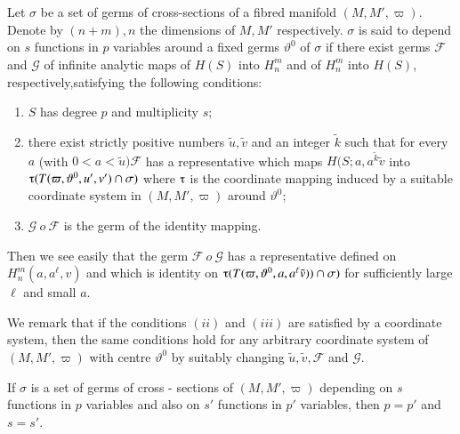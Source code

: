 \section{}\label{chap1:sec1.12} %

\begin{defi*}%
  Let $\sigma$ be a set of germs of cross-sections of a fibred
  manifold $(M,  M',  \varpi)$. Denote by $(n+m),  n$ the dimensions
  of $M,  M'$ respectively. $\sigma$ is said to depend on $s$
  functions in $p$ variables around a fixed germs $\vartheta^0$ of
  $\sigma$ if there exist germs $\mathscr{F}$ and $\mathscr{G}$ of
  infinite analytic maps of $H(S)$ into $H^m_n$ and of $H^m_n$ into
  $H(S)$,  respectively,\pageoriginale  satisfying the following conditions: 
  \begin{enumerate}[\rm (i)]
  \item $S$ has degree $p$ and multiplicity $s$;
  \item there exist strictly positive numbers $\tilde{u},  \tilde{v}$
    and an integer $\tilde{k}$ such that for every $a$ (with $0 < a <
    \tilde{u}) \mathscr{F}$ has a representative which maps $H(S; a,
    a^{\tilde{k}} \tilde{v}$ into $\tauup (T(\varpi,  \vartheta^0,
    u',  v') \cap \sigma)$ where $\tauup$ is the coordinate mapping
    induced by a suitable coordinate system in $(M,  M',  \varpi)$
    around $\vartheta^0$; 
  \item $\mathscr{G} ~o ~ \mathscr{F}$ is the germ of the identity mapping.
  \end{enumerate}
\end{defi*}

Then we see easily that the germ $\mathscr{F} ~ o ~ \mathscr{G}$ has a
representative defined on $H^m_n (a,  a^\ell,  v)$ and which is
identity on $\tauup (T(\varpi,  \vartheta^0,  a,  a^\ell \tilde{v}))
\cap \sigma)$ for sufficiently large $\ell$ and small $a$. 

We remark that if the conditions $(ii)$ and $(iii)$ are satisfied by a
coordinate system,  then the same conditions hold for any arbitrary
coordinate system of $(M,  M',  \varpi)$ with centre $\vartheta^0$ by
suitably changing $\tilde{u},  \tilde{v},  \mathscr{F}$ and
$\mathscr{G}$. 

\begin{proposition}\label{chap1:sec1.12:prop11}%
  If $\sigma$ is a set of germs of cross - sections of $(M,  M',
  \varpi)$ depending on $s$ functions in $p$ variables and also on
  $s'$ functions in $p'$ variables,  then $p = p'$ and $s = s'$. 
\end{proposition}

